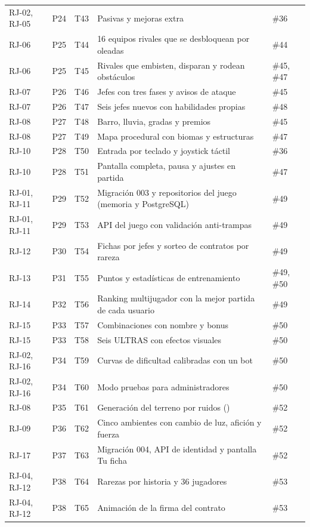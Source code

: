 {\begin{longtable}{@{}L{1.5cm} L{0.8cm} L{1.3cm} L{7.0cm} L{2.9cm}@{}}
RJ-02, RJ-05 & P24 & T43 & Pasivas y mejoras extra & \#36 \\
RJ-06 & P25 & T44 & 16 equipos rivales que se desbloquean por oleadas & \#44 \\
RJ-06 & P25 & T45 & Rivales que embisten, disparan y rodean obstáculos & \#45, \#47 \\
RJ-07 & P26 & T46 & Jefes con tres fases y avisos de ataque & \#45 \\
RJ-07 & P26 & T47 & Seis jefes nuevos con habilidades propias & \#48 \\
RJ-08 & P27 & T48 & Barro, lluvia, gradas y premios & \#45 \\
RJ-08 & P27 & T49 & Mapa procedural con biomas y estructuras & \#47 \\
RJ-10 & P28 & T50 & Entrada por teclado y joystick táctil & \#36 \\
RJ-10 & P28 & T51 & Pantalla completa, pausa y ajustes en partida & \#47 \\
RJ-01, RJ-11 & P29 & T52 & Migración 003 y repositorios del juego (memoria y PostgreSQL) & \#49 \\
RJ-01, RJ-11 & P29 & T53 & API del juego con validación anti-trampas & \#49 \\
RJ-12 & P30 & T54 & Fichas por jefes y sorteo de contratos por rareza & \#49 \\
RJ-13 & P31 & T55 & Puntos y estadísticas de entrenamiento & \#49, \#50 \\
RJ-14 & P32 & T56 & Ranking multijugador con la mejor partida de cada usuario & \#49 \\
RJ-15 & P33 & T57 & Combinaciones con nombre y bonus & \#50 \\
RJ-15 & P33 & T58 & Seis ULTRAS con efectos visuales & \#50 \\
RJ-02, RJ-16 & P34 & T59 & Curvas de dificultad calibradas con un bot & \#50 \\
RJ-02, RJ-16 & P34 & T60 & Modo pruebas para administradores & \#50 \\
RJ-08 & P35 & T61 & Generación del terreno por ruidos () & \#52 \\
RJ-09 & P36 & T62 & Cinco ambientes con cambio de luz, afición y fuerza & \#52 \\
RJ-17 & P37 & T63 & Migración 004, API de identidad y pantalla Tu ficha & \#52 \\
RJ-04, RJ-12 & P38 & T64 & Rarezas por historia y 36 jugadores & \#53 \\
RJ-04, RJ-12 & P38 & T65 & Animación de la firma del contrato & \#53 \\

\end{longtable}}
